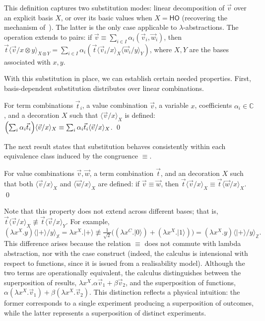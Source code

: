 \documentclass[a4paper,UKenglish,numberwithinsect,pdfa,anonymous]{lipics-v2021}
\theoremstyle{restatestyle}
\newcommand\ket[1]{\ensuremath{|#1\rangle}}
\newcommand\ansubst[2]{\ensuremath{\langle #1 \rangle_{#2}}}
\newcommand\AbsBasis{\ensuremath{\mathsf{H\!O}}}
\def\C{\mathbb{C}}            %
\def\Lam#1#2#3{\lambda#1^{#2}{.}#3} %
\newcommand\B{\mathbb Z}
\newcommand\XB{\mathbb X}
\begin{document}
This definition captures two substitution modes: linear decomposition of $\vec v$
over an explicit basis $X$, or over its basic values when $X=\AbsBasis$
(recovering the mechanism of~\cite{ArrighiDowekLMCS17}). The latter is the only
case applicable to $\lambda$-abstractions. The operation extends to pairs: if
$\vec v\equiv\sum_{i\in I}\alpha_i(\vec{v}_i, \vec{w}_i)$, then $\vec t
\ansubst{\vec v/x\otimes y}{X\otimes Y} = \sum_{i\in I}\alpha_i (\vec t
\ansubst{\vec{v}_i/x}{X}\ansubst{\vec{w}_i/y}{Y})$, where $X, Y$ are
the bases associated with $x, y$.

With this substitution in place, we can establish certain needed properties.
First, basis-dependent substitution distributes over linear combinations.

\begin{lemma}\label{lem:distributiveSubstitution}
  For term combinations $\vec{t}_{i}$, a value combination $\vec{v}$, a
  variable $x$, coefficients $\alpha_i\in\C$, and a decoration $X$ such that
  $\ansubst{\vec v/x}{X}$ is defined:
  \(
    \Bigl(\sum_i \alpha_i\vec{t}_{i}\Bigr)\ansubst{\vec v/x}{X}
    \equiv
    \sum_i \alpha_i\vec{t}_{i} \ansubst{\vec v/x}{X}
  \).
  \qed
\end{lemma}

The next result states that substitution behaves consistently within each
equivalence class induced by the congruence $\equiv$.

\begin{lemma}\label{lem:EquivSubstitutions}
  For value combinations $\vec{v},\vec{w}$, a term combination $\vec{t}$, and
  an decoration $X$ such that both
  $\ansubst{\vec{v}/x}{X}$ and $\ansubst{\vec{w}/x}{X}$ are defined:
  if $\vec{v}\equiv\vec{w}$, then
  $\vec{t}\ansubst{\vec{v}/x}{X}
  \equiv\vec{t}\ansubst{\vec{w}/x}{X}$.
  \qed
\end{lemma}

Note that this property does not extend across different bases; that is,
$\vec{t}\ansubst{\vec{v}/x}{X} \not\equiv\vec{t}\ansubst{\vec{v}/x}{Y}$.
For example,
\[
  (\Lam{x}{X}{y})\ansubst{\ket{+}/y}{\XB}
  = \Lam{x}{X}{\ket{+}} 
  \not\equiv
  \tfrac{1}{\sqrt{2}}\big((\Lam{x}{C}{\ket{0}})
  + (\Lam{x}{X}{\ket{1}})\big)
  = (\Lam{x}{X}{y})\ansubst{\ket{+}/y}{\B}.
\]
This difference arises because the relation $\equiv$ does not commute with
lambda abstraction, nor with the case construct (indeed, the calculus is
intensional with respect to functions, since it is issued from a realisability
model).  Although the two terms are operationally equivalent, the calculus
distinguishes between the superposition of results, $\Lam{x}{X}{\alpha\vec{v}_{1}
+ \beta\vec{v}_{2}}$, and the superposition of functions,
$\alpha(\Lam{x}{X}{\vec{v}_{1}}) + \beta(\Lam{x}{X}{\vec{v}_{2}})$. 
This distinction reflects a physical intuition: the former corresponds to a
single experiment producing a superposition of outcomes, while the latter
represents a superposition of distinct experiments.
\end{document}
